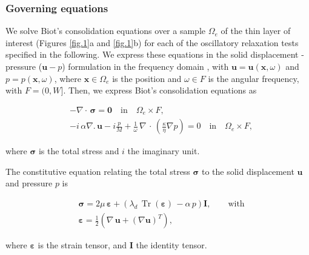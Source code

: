 \documentclass[draft]{agujournal2019}
\DeclareMathOperator{\tr}{Tr}
\begin{document}
\subsubsection{Governing equations}
We solve Biot's consolidation equations \cite{Biot1941, Biot1962} over a sample  $\Omega_e$ of the thin layer of interest (Figures \ref{fig.1}a and \ref{fig.1}b) for each of the oscillatory relaxation tests specified in the following. We express these equations in the solid displacement - pressure ($\bm{u}-p$) formulation in the frequency domain \cite{Quintal2011,Favino2020},  with $\bm{u} = \bm{u}(\bm{x}, \omega)$ and $p = p(\bm{x},\omega)$, where $\bm{x} \in \Omega_e$ is the position and $\omega \in F$ is the angular frequency, with $F =(0,W]$.
Then, we express Biot's consolidation equations as  
\begin{linenomath*}
\begin{equation}\label{Eq.6}
\begin{split}
& - \nabla \cdot \, \bm{\sigma} = \bm{0}  \quad  \textrm{in} \quad \Omega_e \times F,  \\
& - i \, \alpha \nabla . \, \bm{u} -i \frac{p}{M} + \frac{1}{\omega} \,\nabla \, \cdot \, \left( \frac{\kappa}{\eta} \nabla p\right)  =0 \quad  \textrm{in} \quad \Omega_e \times F,
\end{split}
\end{equation}
\end{linenomath*}
where $\bm{\sigma}$ is the total stress and $i$ the imaginary unit.

The constitutive equation relating the total stress $\bm{\sigma}$ to the solid displacement $\bm{u}$ and pressure $p$ is
\begin{linenomath*}
\begin{equation}\label{Eq.7}
\begin{split}
& \bm{\sigma} =  2\mu \, \bm{\varepsilon} +  \left( \lambda_d \,  \tr( \bm{\varepsilon})\, - \alpha \,p \right) \bm{I}, \qquad \text{with}\\
& \bm{\varepsilon} = \frac{1}{2} \left( \nabla \,\bm{u} + ({\nabla  \bm{u}})^T  \right),
 \end{split}
\end{equation}
\end{linenomath*}
where $\bm{\varepsilon}$ is the strain tensor,
and $\bm{I}$ the identity tensor. 

 
\end{document}
